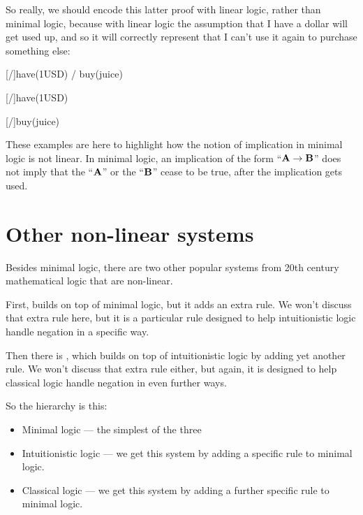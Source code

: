 \documentclass[../../../main.tex]{subfiles}
\begin{document}
So really, we should encode this latter proof with linear logic, rather than minimal logic, because with linear logic the assumption that I have a dollar will get used up, and so it will correctly represent that I can't use it again to purchase something else:

\begin{prooftree*}
  \hypo{}
  [\startrule/]{have(1USD) \lolli/ buy(juice)}

  \hypo{}
  [\startrule/]{have(1USD)}

  [\lolliElim/]{buy(juice)}
\end{prooftree*}

\noindent
These examples are here to highlight how the notion of implication in minimal logic is not linear. In minimal logic, an implication of the form ``$\nd{A \impl/ B}$'' does not imply that the ``$\mathbf{A}$'' or the ``$\mathbf{B}$'' cease to be true, after the implication gets used.


\section{Other non-linear systems}

Besides minimal logic, there are two other popular systems from 20th century mathematical logic that are non-linear. 

First,  builds on top of minimal logic, but it adds an extra rule. We won't discuss that extra rule here, but it is a particular rule designed to help intuitionistic logic handle negation in a specific way.

Then there is , which builds on top of intuitionistic logic by adding yet another rule. We won't discuss that extra rule either, but again, it is designed to help classical logic handle negation in even further ways.

So the hierarchy is this:

\begin{itemize}
  \item{Minimal logic --- the simplest of the three}
  \item{Intuitionistic logic --- we get this system by adding a specific rule to minimal logic.}
  \item{Classical logic --- we get this system by adding a further specific rule to minimal logic.}
\end{itemize}
\end{document}
